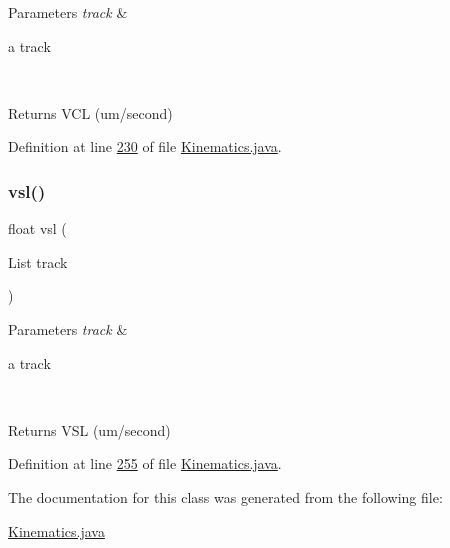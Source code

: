\begin{DoxyParams}{Parameters}
{\em track} & 
\begin{DoxyItemize}
\item a track 
\end{DoxyItemize}\\
\hline
\end{DoxyParams}
\begin{DoxyReturn}{Returns}
V\+CL (um/second) 
\end{DoxyReturn}


Definition at line \hyperlink{_kinematics_8java_source_l00230}{230} of file \hyperlink{_kinematics_8java_source}{Kinematics.\+java}.

\hypertarget{classfunctions_1_1_kinematics_a938c4a9daa152f426259a01bc6654b25}{}\label{classfunctions_1_1_kinematics_a938c4a9daa152f426259a01bc6654b25} 
\subsubsection{\texorpdfstring{vsl()}{vsl()}}
{\footnotesize\ttfamily float vsl (\begin{DoxyParamCaption}\item[{List}]{track }\end{DoxyParamCaption})}


\begin{DoxyParams}{Parameters}
{\em track} & 
\begin{DoxyItemize}
\item a track 
\end{DoxyItemize}\\
\hline
\end{DoxyParams}
\begin{DoxyReturn}{Returns}
V\+SL (um/second) 
\end{DoxyReturn}


Definition at line \hyperlink{_kinematics_8java_source_l00255}{255} of file \hyperlink{_kinematics_8java_source}{Kinematics.\+java}.



The documentation for this class was generated from the following file\+:\begin{DoxyCompactItemize}
\item 
\hyperlink{_kinematics_8java}{Kinematics.\+java}\end{DoxyCompactItemize}

